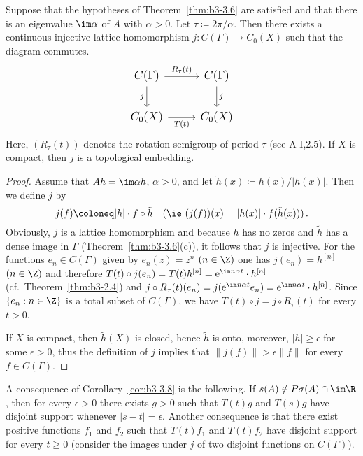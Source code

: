 \begin{corollary}\label{cor:b3-3.8}
Suppose that the hypotheses of Theorem~\ref{thm:b3-3.6} are satisfied and that there is an eigenvalue $\im \alpha$ of $A$ with $\alpha > 0$.
Let $\tau \coloneq 2\pi/\alpha$.
Then there exists a continuous injective lattice homomorphism $j : C(\Gamma) \to C_{0}(X)$ such that the diagram commutes. 
%
\[\large
\begin{tikzcd}
C(\Gamma) \arrow[r, "R_{\tau}(t)"] \arrow[d, "j"'] & C(\Gamma) \arrow[d, "j"] \\
C_{0}(X) \arrow[r, "T(t)"'] & C_{0}(X)
\end{tikzcd}
\]
Here, $(R_{\tau}(t))$ denotes the rotation semigroup of period $\tau$ (see A-I,2.5).
If $X$ is compact, then $j$ is a topological embedding.
\end{corollary}
\begin{proof}
	Assume that $Ah = \im\alpha h$, $\alpha > 0$, and let $\tilde{h}(x) \coloneq h(x)/|h(x)|$.
	Then we define $j$ by
	\begin{equation}\label{eq:b3-3.9}
	j(f) \coloneq |h|\cdot f\circ\tilde{h} \quad \text{(\ie }(j(f))(x) = |h(x)|\cdot f(\tilde{h}(x)))\,.
	\end{equation}
	Obviously, $j$ is a lattice homomorphism and because $h$ has no zeros and $\tilde{h}$ has a dense image in $\Gamma$ (Theorem~\ref{thm:b3-3.6}(c)), it follows that $j$ is injective.
	For the functions $e_{n} \in C(\Gamma)$ given by $e_{n}(z) = z^{n}$ $(n \in \Z)$ one has $j(e_{n}) = h^{[n]}$ $(n \in \Z)$ and therefore 
	$T(t)\circ j(e_{n}) = T(t)h^{[n]} = \mathrm{e}^{\im n\alpha t}\cdot h^{[n]}$ (cf.\ Theorem~\ref{thm:b3-2.4}) and $j\circ R_{\tau}(t)(e_{n}) = j(\mathrm{e}^{\im n\alpha t}e_{n}) = \mathrm{e}^{\im n\alpha t}\cdot h^{[n]}$.
	Since $\{e_{n} : n \in \Z\}$ is a total subset of $C(\Gamma)$, we have $T(t)\circ j = j\circ R_{\tau}(t)$ for every $t > 0$.
	
	If $X$ is compact, then $\tilde{h}(X)$ is closed, hence $\tilde{h}$ is onto, moreover, $|h| \geq \epsilon$ for some $\epsilon > 0$, thus the definition of $j$ implies that $\|j(f)\| > \epsilon\|f\|$ for every $f \in C(\Gamma)$.
\end{proof}
A consequence of Corollary~\ref{cor:b3-3.8} is the following. If $s(A) \notin P\sigma(A)\cap \im\R$, then for every $\epsilon > 0$ there exists $g > 0$ such that $T(t)g$ and $T(s)g$ have disjoint support whenever $|s - t| = \epsilon$.
Another consequence is that there exist positive functions $f_{1}$ and $f_{2}$ such that $T(t)f_{1}$ and $T(t)f_{2}$ have disjoint support for every $t \geq 0$ (consider the images under $j$ of two disjoint functions on $C(\Gamma)$).
